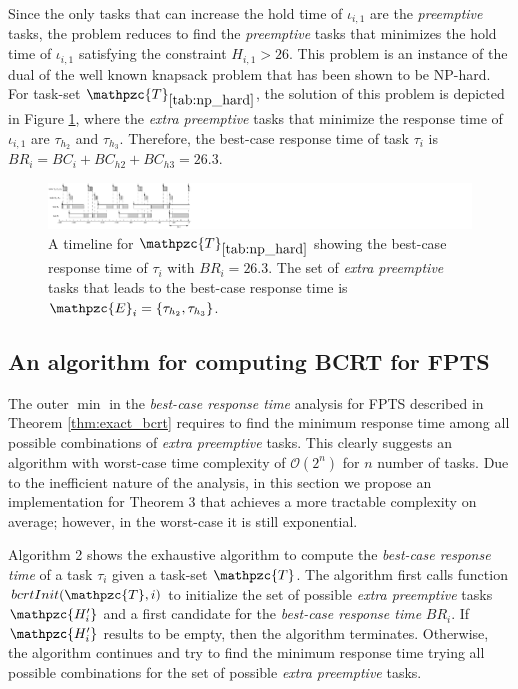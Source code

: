 \documentclass[fleqn]{article}
\begin{document}
Since the only tasks that can increase the hold time of $\iota_{i,1}$ are the \textit{preemptive} tasks, the problem reduces to find the \textit{preemptive} tasks that minimizes the hold time of  $\iota_{i,1}$ satisfying the constraint $H_{i,1} > 26$. This problem is an instance of the dual of the well known knapsack problem that has been shown to be NP-hard. For task-set $\mathpzc{T}_{\ref{tab:np_hard}}$, the solution of this problem is depicted in Figure \ref{fig:np_hard2}, where the \textit{extra preemptive} tasks that minimize the response time of $\iota_{i,1}$ are $\tau_{h_2}$ and $\tau_{h_3}$. Therefore, the best-case response time of task $\tau_i$ is $BR_i = BC_i+BC_{h2}+BC_{h3} =26.3$.

\begin{figure}[H]
	\centering
	\includegraphics[width=1\linewidth]{figures/multiple_tasks2}
	\caption{A timeline for $\mathpzc{T}_{\ref{tab:np_hard}}$ showing the best-case response time of $\tau_i$ with $BR_i = 26.3$. The set of \textit{extra preemptive} tasks that leads to the best-case response time is $\mathpzc{E}_i=\{\tau_{h_2},\tau_{h_3}\}$.}
	\label{fig:np_hard2}
\end{figure}

\subsection{An algorithm for computing BCRT for FPTS}
The outer $\min$ in the \textit{best-case response time} analysis for FPTS described in Theorem \ref{thm:exact_bcrt} requires to find the minimum response time among all possible combinations of \textit{extra preemptive} tasks. This clearly suggests an algorithm with worst-case time complexity of $\mathcal{O}(2^n)$ for $n$ number of tasks. Due to the inefficient nature of the analysis, in this section we propose an implementation for Theorem 3 that achieves a more tractable complexity on average; however, in the worst-case it is still exponential.

Algorithm 2 shows the exhaustive algorithm to compute the \textit{best-case response time} of a task $\tau_i$ given a task-set $\mathpzc{T}$. The algorithm first calls function $bcrtInit(\mathpzc{T},i)$ to initialize the set of possible \textit{extra preemptive} tasks $\mathpzc{H^{\prime}_i}$ and a first candidate for the \textit{best-case response time} $BR_i$. If $\mathpzc{H^{\prime}_i}$ results to be empty, then the algorithm terminates. Otherwise, the algorithm continues and try to find the minimum response time trying all possible combinations for the set of possible \textit{extra preemptive} tasks.
\end{document}
